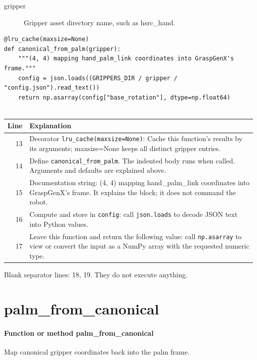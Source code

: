 \documentclass[11pt,a4paper]{book}
\begin{document}
\begin{description}
\item[gripper] Gripper asset directory name, such as hsrc\_hand.
\end{description}

\begin{lstlisting}[firstnumber=13]
@lru_cache(maxsize=None)
def canonical_from_palm(gripper):
    """(4, 4) mapping hand_palm_link coordinates into GraspGenX's frame."""
    config = json.loads((GRIPPERS_DIR / gripper / "config.json").read_text())
    return np.asarray(config["base_rotation"], dtype=np.float64)


\end{lstlisting}

\begin{longtable}{r p{}}

\textbf{Line} & \textbf{Explanation} \\ \hline \endhead

13 & Decorator \texttt{lru\_cache(maxsize=None)}: Cache this function's results by its arguments; maxsize=None keeps all distinct gripper entries. \\

14 & Define \texttt{canonical\_from\_palm}. The indented body runs when called. Arguments and defaults are explained above. \\

15 & Documentation string: (4, 4) mapping hand\_palm\_link coordinates into GraspGenX's frame. It explains the block; it does not command the robot. \\

16 & Compute and store in \texttt{config}: call \texttt{json.loads} to decode JSON text into Python values.  \\

17 & Leave this function and return the following value: call \texttt{np.asarray} to view or convert the input as a NumPy array with the requested numeric type. \\

\end{longtable}

Blank separator lines: 18, 19. They do not execute anything.

\section{palm\_from\_canonical}

\paragraph{Function or method palm\_from\_canonical}
Map canonical gripper coordinates back into the palm frame.
\end{document}
